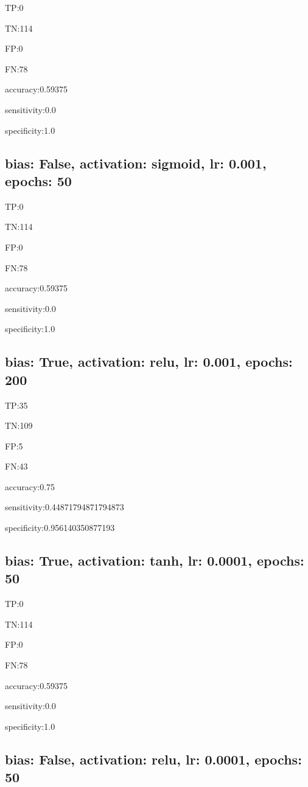 \documentclass{article}
\begin{document}
TP:0

TN:114

FP:0

FN:78

accuracy:0.59375

sensitivity:0.0

specificity:1.0



\subsection{bias: False, activation: sigmoid, lr: 0.001, epochs: 50}

TP:0

TN:114

FP:0

FN:78

accuracy:0.59375

sensitivity:0.0

specificity:1.0



\subsection{bias: True, activation: relu, lr: 0.001, epochs: 200}

TP:35

TN:109

FP:5

FN:43

accuracy:0.75

sensitivity:0.44871794871794873

specificity:0.956140350877193



\subsection{bias: True, activation: tanh, lr: 0.0001, epochs: 50}

TP:0

TN:114

FP:0

FN:78

accuracy:0.59375

sensitivity:0.0

specificity:1.0



\subsection{bias: False, activation: relu, lr: 0.0001, epochs: 50}
\end{document}
